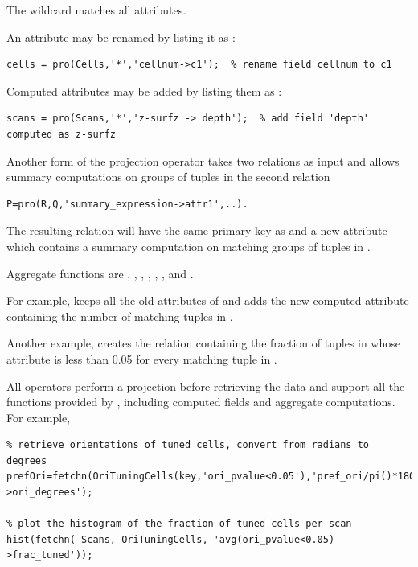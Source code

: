 \documentclass[10pt]{article}
\begin{document}
The wildcard  matches all attributes. 

An attribute may be renamed by listing it as :
\begin{lstlisting}
cells = pro(Cells,'*','cellnum->c1');  % rename field cellnum to c1
\end{lstlisting}

Computed attributes may be added by listing them as :

\begin{lstlisting}
scans = pro(Scans,'*','z-surfz -> depth');  % add field 'depth' computed as z-surfz
\end{lstlisting}

Another form of the projection operator takes two relations as input and allows summary computations on groups of tuples in the second relation
\begin{lstlisting}  
P=pro(R,Q,'summary_expression->attr1',..). 
\end{lstlisting}
The resulting relation  will have the same primary key as  and a new attribute  which contains a summary computation on matching groups of tuples in .  

Aggregate functions are , , , , , , and .

For example,  keeps all the old attributes of  and adds the new computed attribute  containing the number of matching tuples in . 

Another example,  creates the relation  containing the fraction of tuples in  whose attribute  is less than 0.05 for every matching tuple in .

All  operators perform a projection before retrieving the data and support all the functions provided by , including computed fields and aggregate computations.  For example, 
\begin{lstlisting}
% retrieve orientations of tuned cells, convert from radians to degrees
prefOri=fetchn(OriTuningCells(key,'ori_pvalue<0.05'),'pref_ori/pi()*180->ori_degrees'); 

% plot the histogram of the fraction of tuned cells per scan
hist(fetchn( Scans, OriTuningCells, 'avg(ori_pvalue<0.05)->frac_tuned'));  
\end{lstlisting}
\end{document}
